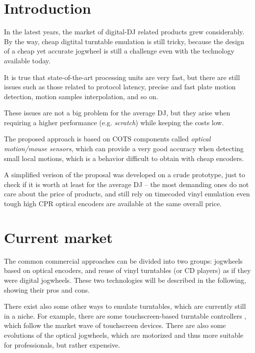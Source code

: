 \documentclass[a4paper,10pt]{article}
\begin{document}
\vspace{4ex}	%
\begin{multicols}{2}


\section{Introduction}

In the latest years, the market of digital-DJ related products grew considerably.
By the way, cheap digtital turntable emulation is still tricky, because the
design of a cheap yet accurate jogwheel is still a challenge even with the
technology available today.

It is true that state-of-the-art processing units are very fast, but there are
still issues such as those related to protocol latency, precise and fast plate
motion detection, motion samples interpolation, and so on.

These issues are not a big problem for the average DJ, but they arise when
requiring a higher performance (e.g. \emph{scratch}) while keeping the costs
low.

The proposed approach is based on COTS components called \emph{optical motion/mouse
sensors}, which can provide a very good accuracy when detecting small local
motions, which is a behavior difficult to obtain with cheap encoders.

A simplified verison of the proposal was developed on a crude prototype, just
to check if it is worth at least for the average DJ -- the most demanding ones
do not care about the price of products, and still rely on timecoded vinyl
emulation even tough high CPR optical encoders are available at the same
overall price.


\section{Current market}

The common commercial approaches can be divided into two groups: jogwheels
based on optical encoders, and reuse of vinyl turntables (or CD players) as if
they were digital jogwheels. These two technologies will be described in the
following, showing their pros and cons.

There exist also some other ways to emulate turntables, which are currently
still in a niche. For example, there are some touchscreen-based turntable
controllers \CITEME, which follow the market wave of touchscreen devices.
There are also some evolutions of the optical jogwheels, which are motorized
\CITEME and thus more suitable for professionals, but rather expensive.



\end{multicols}
\end{document}
